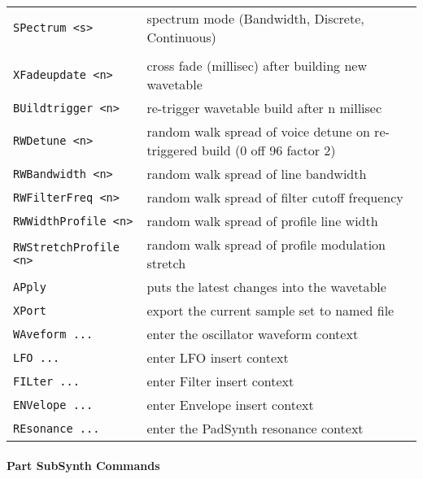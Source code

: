 \begin{center}
\begin{longtable}{p{5cm} p{13cm}}
\texttt{SPectrum <s>} &
   spectrum mode (Bandwidth, Discrete, Continuous) \\
\texttt{} & \\ %
\texttt{XFadeupdate <n>} &
   cross fade (millisec) after building new wavetable \\
\texttt{BUildtrigger <n>} &
   re-trigger wavetable build after n millisec \\
\texttt{RWDetune <n>} &
   random walk spread of voice detune on re-triggered build (0 off 96 factor 2) \\
\texttt{RWBandwidth <n>} &
   random walk spread of line bandwidth \\
\texttt{RWFilterFreq <n>} &
   random walk spread of filter cutoff frequency \\
\texttt{RWWidthProfile <n>} &
   random walk spread of profile line width \\
\texttt{RWStretchProfile <n>} &
   random walk spread of profile modulation stretch \\
\texttt{APply} &
   puts the latest changes into the wavetable \\
\texttt{XPort} &
   export the current sample set to named file \\
\texttt{WAveform ...} &
   enter the oscillator waveform context \\
\texttt{LFO ...} &
   enter LFO insert context  \\
\texttt{FILter ...} &
   enter Filter insert context  \\
\texttt{ENVelope ...} &
   enter Envelope insert context   \\
\texttt{REsonance ...} &
   enter the PadSynth resonance context \\

\end{longtable}
\end{center}

\pagebreak
\paragraph{Part SubSynth Commands}
\label{paragraph:command_line_part_subsynth_commands}

